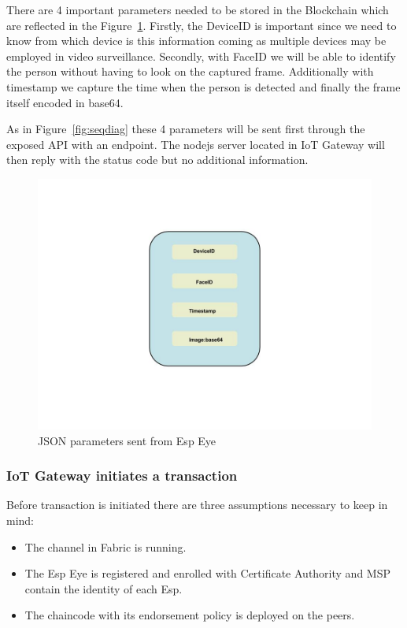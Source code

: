 There are 4 important parameters needed to be stored in the Blockchain which are reflected in the Figure~\ref{fig:json}. Firstly, the DeviceID is important since we need to know from which device is this information coming as multiple devices may be employed in video surveillance. Secondly, with FaceID we will be able to identify the person without having to look on the captured frame. Additionally with timestamp we capture the time when the person is detected and finally the frame itself encoded in base64. 

As in Figure~\ref{fig:seqdiag} these 4 parameters will be sent first through the exposed API with an endpoint. The nodejs server located in IoT Gateway will then reply with the status code but no additional information. 

\begin{figure}[!htb]
    \centering
    \includegraphics[width=1\textwidth]{figures/json2.jpg}
    \caption{JSON parameters sent from Esp Eye}
    \label{fig:json}
\end{figure}
\subsubsection{IoT Gateway initiates a transaction}
Before transaction is initiated there are three assumptions necessary to keep in mind:
\begin{itemize}
    \item The channel in Fabric is running.
    \item The Esp Eye is registered and enrolled with Certificate Authority and MSP contain the identity of each Esp.
    \item The chaincode with its endorsement policy is deployed on the peers.
\end{itemize}


